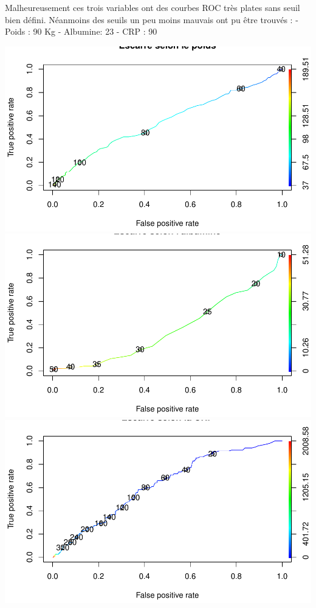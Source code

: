 \documentclass[a4paper, french]{article}
\begin{document}
Malheureusement ces trois variables ont des courbes ROC très plates sans
seuil bien défini. Néanmoins des seuils un peu moins mauvais ont pu être
trouvés : - Poids : 90 Kg - Albumine: 23 - CRP : 90

\includegraphics{book_escarre_files/figure-latex/roc-1.pdf}
\includegraphics{book_escarre_files/figure-latex/roc-2.pdf}
\includegraphics{book_escarre_files/figure-latex/roc-3.pdf}
\end{document}
